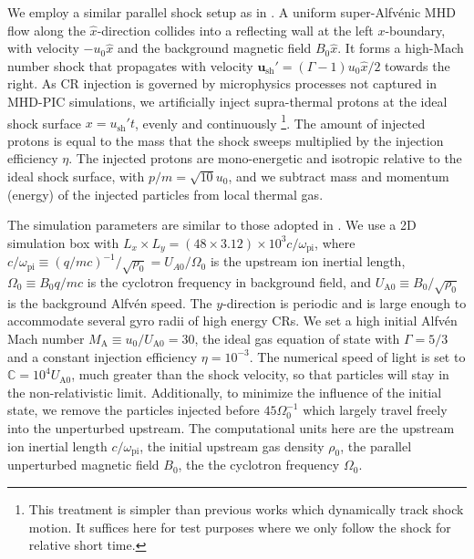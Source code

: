 \documentclass[fleqn,usenatbib]{mnras}
\begin{document}
We employ a similar parallel shock setup as in \citet{2015ApJ...809...55B}. A uniform super-Alfv\'enic MHD flow along the $\hat{x}$-direction collides into a reflecting wall at the left $x$-boundary, with velocity $-u_0 \hat{x}$ and the background magnetic field $B_0 \hat{x}$. It forms a high-Mach number shock that propagates with velocity $\boldsymbol{u}_\text{sh}' = \left(\Gamma - 1\right) u_0 \hat{x}/2$ 
towards the right.
As CR injection is governed by microphysics processes not captured in MHD-PIC simulations, we artificially inject supra-thermal protons at the ideal shock surface $x=u_\text{sh}' t$, evenly and continuously \footnote{This treatment is simpler than previous works \citep[e.g. ][]{2015ApJ...809...55B, 2018MNRAS.473.3394V, 2018ApJ...859...13M} which dynamically track shock motion. It suffices here for test purposes where we only follow the shock for relative short time.}. The amount of injected protons is equal to the mass that the shock sweeps multiplied by the injection efficiency $\eta$. The injected protons are mono-energetic and isotropic relative to the ideal shock surface,
with $p/m = \sqrt{10}u_0$, and we subtract mass and momentum (energy) of the injected particles from local thermal gas.

The simulation parameters are similar to those adopted in \citet{2015ApJ...809...55B}. We use a 2D simulation box with  $L_x\times L_y = \left(48 \times 3.12\right)\times 10^3 c/\omega_\text{pi}$, where $c/\omega_\text{pi} \equiv \left(q/mc\right)^{-1}/ \sqrt{\rho_0}=U_{A0}/\Omega_0$ is the upstream ion inertial length, $\Omega_0\equiv B_0 q /mc$ is the cyclotron frequency in background field, and $U_\text{A0} \equiv B_0 /\sqrt{\rho_0}$ is the background Alfv\'en speed. The $y$-direction is periodic and is large enough to accommodate several gyro radii of high energy CRs. We set a high initial Alfv\'en Mach number $M_\text{A} \equiv u_0 / U_\text{A0}= 30$, the ideal gas equation of state with $\Gamma=5/3$ and a constant injection efficiency $\eta = 10^{-3}$. The numerical speed of light is set to $\mathbb{C} = 10^4 U_\text{A0}$, much greater than the shock velocity, so that particles will stay in the non-relativistic limit. Additionally, to minimize the influence of the initial state, we remove the particles injected before $45 \Omega_0^{-1}$ which largely travel freely into the unperturbed upstream. The computational units here are the upstream ion inertial length $c/\omega_\text{pi}$, the initial upstream gas density $\rho_0$, the parallel unperturbed magnetic field $B_0$, the the cyclotron frequency $\Omega_0$. 
\end{document}
